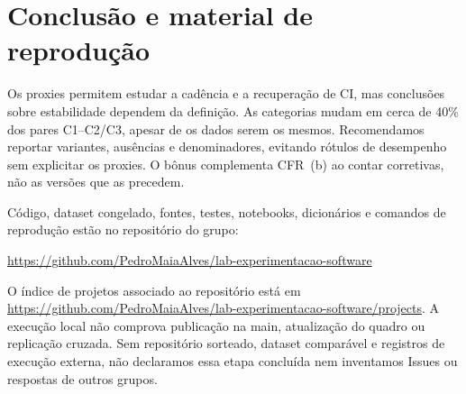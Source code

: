 \section{Conclusão e material de reprodução}

Os proxies permitem estudar a cadência e a recuperação de CI, mas conclusões sobre
estabilidade dependem da definição. As categorias mudam em cerca de 40\% dos pares
C1--C2/C3, apesar de os dados serem os mesmos. Recomendamos reportar variantes,
ausências e denominadores, evitando rótulos de desempenho sem explicitar os proxies.
O bônus complementa CFR~(b) ao contar corretivas, não as versões que as precedem.

Código, dataset congelado, fontes, testes, notebooks, dicionários e comandos de
reprodução estão no repositório do grupo:
\begin{flushleft}\footnotesize
\url{https://github.com/PedroMaiaAlves/lab-experimentacao-software}
\end{flushleft}
O índice de projetos associado ao repositório está em
\url{https://github.com/PedroMaiaAlves/lab-experimentacao-software/projects}.
A execução local não comprova publicação na main, atualização do quadro ou
replicação cruzada. Sem repositório sorteado, dataset comparável e registros de
execução externa, não declaramos essa etapa concluída nem inventamos Issues ou
respostas de outros grupos.
